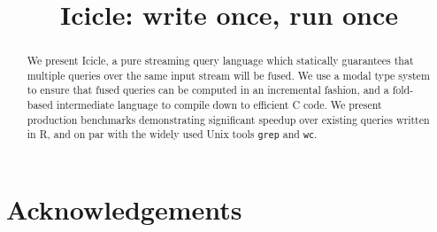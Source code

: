 \documentclass[preprint]{sigplanconf}
\begin{document}
\doi{}

\title{Icicle: write once, run once}


\maketitle
\makeatactive

\begin{abstract}
We present Icicle, a pure streaming query language which statically guarantees that multiple queries over the same input stream will be fused. We use a modal type system to ensure that fused queries can be computed in an incremental fashion, and a fold-based intermediate language to compile down to efficient C code. We present production benchmarks demonstrating significant speedup over existing queries written in R, and on par with the widely used Unix tools \texttt{grep} and \texttt{wc}.

\end{abstract}








\section*{Acknowledgements}



\end{document}
